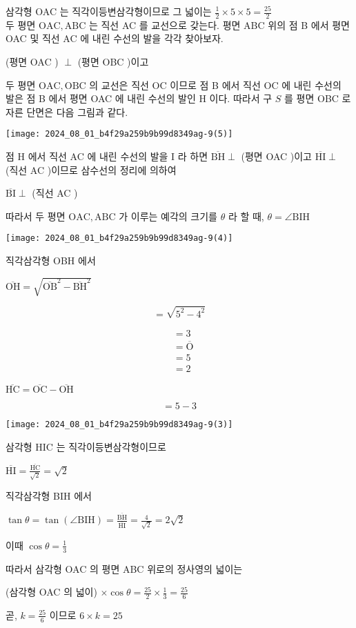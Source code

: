 \documentclass[10pt]{article}
\begin{document}
삼각형 OAC 는 직각이등변삼각형이므로 그 넓이는 $\frac{1}{2} \times 5 \times 5=\frac{25}{2}$\\
두 평면 $\mathrm{OAC}, \mathrm{ABC}$ 는 직선 AC 를 교선으로 갖는다. 평면 ABC 위의 점 B 에서 평면 OAC 및 직선 AC 에 내린 수선의 발을 각각 찾아보자.

(평면 OAC ) $\perp$ (평면 OBC )이고

두 평면 $\mathrm{OAC}, \mathrm{OBC}$ 의 교선은 직선 OC 이므로 점 B 에서 직선 OC 에 내린 수선의 발은 점 B 에서 평면 OAC 에 내린 수선의 발인 H 이다. 따라서 구 $S$ 를 평면 OBC 로 자른 단면은 다음 그림과 같다.

\begin{center}
\texttt{[image: 2024\_08\_01\_b4f29a259b9b99d8349ag-9(5)]}
\end{center}

점 H 에서 직선 AC 에 내린 수선의 발을 I 라 하면 $\overline{\mathrm{BH}} \perp$ (평면 OAC )이고 $\overline{\mathrm{HI}} \perp$ (직선 AC )이므로 삼수선의 정리에 의하여

$\overline{\mathrm{BI}} \perp$ (직선 AC )

따라서 두 평면 $\mathrm{OAC}, \mathrm{ABC}$ 가 이루는 예각의 크기를 $\theta$ 라 할 때, $\theta=\angle \mathrm{BIH}$

\begin{center}
\texttt{[image: 2024\_08\_01\_b4f29a259b9b99d8349ag-9(4)]}
\end{center}

직각삼각형 OBH 에서

$\overline{\mathrm{OH}}=\sqrt{\overline{\mathrm{OB}}^{2}-\overline{\mathrm{BH}}^{2}}$

\[
=\sqrt{5^{2}-4^{2}}
\]

\[
\begin{aligned}
& =3 \\
& =\overline{\mathrm{O}} \\
& =5 \\
& =2
\end{aligned}
\]

$\overline{\mathrm{HC}}=\overline{\mathrm{OC}}-\overline{\mathrm{OH}}$

\[
=5-3
\]

\begin{center}
\texttt{[image: 2024\_08\_01\_b4f29a259b9b99d8349ag-9(3)]}
\end{center}

삼각형 HIC 는 직각이등변삼각형이므로

$\overline{\mathrm{HI}}=\frac{\overline{\mathrm{HC}}}{\sqrt{2}}=\sqrt{2}$

직각삼각형 BIH 에서

$\tan \theta=\tan (\angle \mathrm{BIH})=\frac{\overline{\mathrm{BH}}}{\overline{\mathrm{HI}}}=\frac{4}{\sqrt{2}}=2 \sqrt{2}$

이때 $\cos \theta=\frac{1}{3}$

따라서 삼각형 OAC 의 평면 ABC 위로의 정사영의 넓이는

(삼각형 OAC 의 넓이) $\times \cos \theta=\frac{25}{2} \times \frac{1}{3}=\frac{25}{6}$

곧, $k=\frac{25}{6}$ 이므로 $6 \times k=25$
\end{document}
